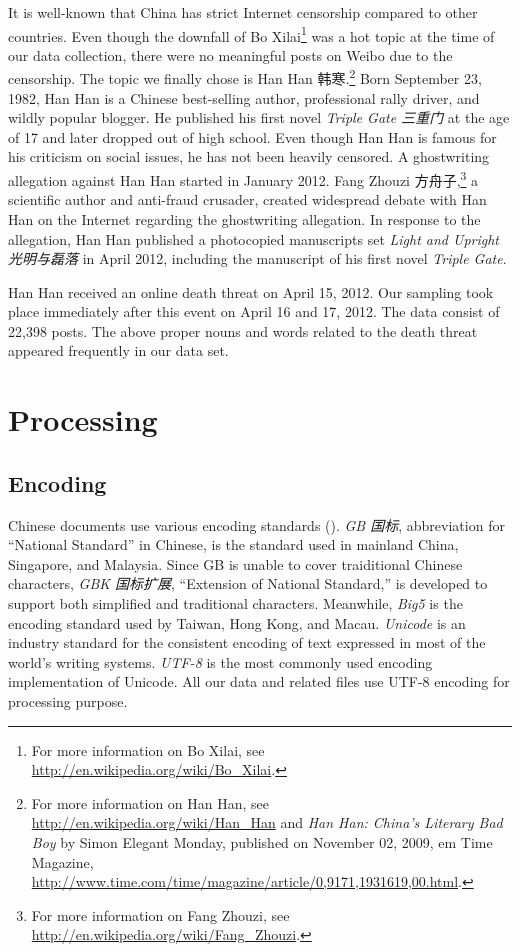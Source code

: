 \documentclass[11pt]{article}
\newcommand{\1}[1]{{\mathbf 1}\left\{#1\right\}}        %
\begin{document}
It is well-known that China has strict Internet censorship compared to other countries. Even though the downfall of Bo Xilai\footnote{For more information on Bo Xilai, see \url{http://en.wikipedia.org/wiki/Bo_Xilai}.}
was a hot topic at the time of our data collection, there were no meaningful posts on Weibo due to the censorship.
The topic we finally chose is Han Han 韩寒.\footnote{For more information on Han Han, see \url{http://en.wikipedia.org/wiki/Han_Han} and {\em Han Han: China's Literary Bad Boy} by Simon Elegant Monday, published on November 02, 2009, {em Time Magazine}, \url{http://www.time.com/time/magazine/article/0,9171,1931619,00.html}.}
Born September 23, 1982, Han Han
is a Chinese best-selling author, professional rally driver, and  wildly  popular blogger. He published his first novel {\em Triple Gate 三重门} at the age of 17 and later dropped out of high school. Even though Han Han is famous for his criticism on social issues, he has not been heavily censored. A ghostwriting allegation against Han Han started in January 2012. Fang Zhouzi 方舟子,\footnote{For more information on Fang Zhouzi, see \url{http://en.wikipedia.org/wiki/Fang_Zhouzi}.}
 a scientific author and anti-fraud crusader, created widespread debate with Han Han on the Internet regarding the ghostwriting allegation. In response to the allegation, Han Han published a photocopied manuscripts set {\em Light and Upright 光明与磊落} in April 2012, including the manuscript of his first novel {\em Triple Gate}. 
 
Han Han received an online death threat on April 15, 2012. 
Our sampling took place immediately after this event on April 16 and 17, 2012. 
The data consist of 22,398 posts. 
The above proper nouns and words related to the death threat appeared frequently in our data set. 




\section{Processing}


\subsection{Encoding}
Chinese documents use various encoding standards (\cite{wong2009introduction}). {\em GB 国标}, abbreviation for ``National Standard'' in Chinese, is the standard used in mainland China, Singapore, and Malaysia. Since GB is unable to cover traiditional Chinese characters, {\em GBK 国标扩展}, ``Extension of National Standard,'' is developed to support both simplified and traditional characters. Meanwhile, {\em Big5} is the encoding standard used by Taiwan, Hong Kong, and Macau. {\em Unicode} is an industry standard for the consistent encoding of text expressed in most of the world's writing systems. {\em UTF-8} is the most commonly used encoding implementation of Unicode. All our data and related files use UTF-8 encoding for processing purpose.
\end{document}
